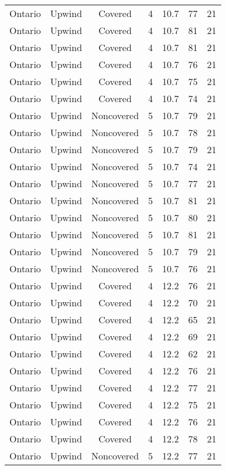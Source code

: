 \documentclass{article}
\begin{document}
\begin{longtable}[H]{ccccccc}
Ontario & Upwind   & Covered     & 4 & 10.7 & 77  & 21 \\
Ontario & Upwind   & Covered     & 4 & 10.7 & 81  & 21 \\
Ontario & Upwind   & Covered     & 4 & 10.7 & 81  & 21 \\
Ontario & Upwind   & Covered     & 4 & 10.7 & 76  & 21 \\
Ontario & Upwind   & Covered     & 4 & 10.7 & 75  & 21 \\
Ontario & Upwind   & Covered     & 4 & 10.7 & 74  & 21 \\
Ontario & Upwind   & Noncovered & 5 & 10.7 & 79  & 21 \\
Ontario & Upwind   & Noncovered & 5 & 10.7 & 78  & 21 \\
Ontario & Upwind   & Noncovered & 5 & 10.7 & 79  & 21 \\
Ontario & Upwind   & Noncovered & 5 & 10.7 & 74  & 21 \\
Ontario & Upwind   & Noncovered & 5 & 10.7 & 77  & 21 \\
Ontario & Upwind   & Noncovered & 5 & 10.7 & 81  & 21 \\
Ontario & Upwind   & Noncovered & 5 & 10.7 & 80  & 21 \\
Ontario & Upwind   & Noncovered & 5 & 10.7 & 81  & 21 \\
Ontario & Upwind   & Noncovered & 5 & 10.7 & 79  & 21 \\
Ontario & Upwind   & Noncovered & 5 & 10.7 & 76  & 21 \\
Ontario & Upwind   & Covered     & 4 & 12.2 & 76  & 21 \\
Ontario & Upwind   & Covered     & 4 & 12.2 & 70  & 21 \\
Ontario & Upwind   & Covered     & 4 & 12.2 & 65  & 21 \\
Ontario & Upwind   & Covered     & 4 & 12.2 & 69  & 21 \\
Ontario & Upwind   & Covered     & 4 & 12.2 & 62  & 21 \\
Ontario & Upwind   & Covered     & 4 & 12.2 & 76  & 21 \\
Ontario & Upwind   & Covered     & 4 & 12.2 & 77  & 21 \\
Ontario & Upwind   & Covered     & 4 & 12.2 & 75  & 21 \\
Ontario & Upwind   & Covered     & 4 & 12.2 & 76  & 21 \\
Ontario & Upwind   & Covered     & 4 & 12.2 & 78  & 21 \\
Ontario & Upwind   & Noncovered & 5 & 12.2 & 77  & 21 \\

\end{longtable}
\end{document}
